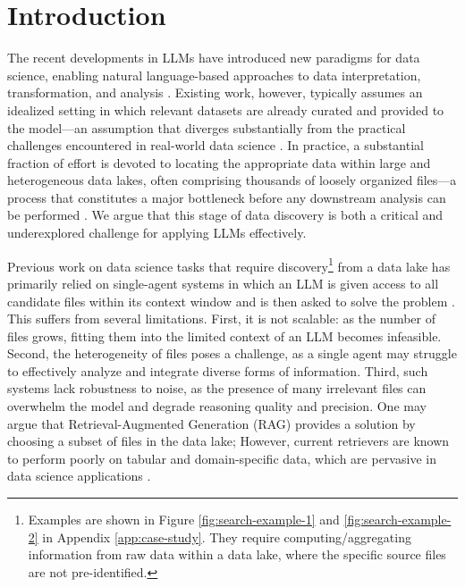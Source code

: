 
\section{Introduction}

\label{sec:introduction}


The recent developments in LLMs have introduced new paradigms for data science, enabling natural language-based approaches to data interpretation, transformation, and analysis \citep{jing2025dsbench, huang-etal-2024-da, hong-etal-2025-data, wang2025largelanguagemodelbaseddata}. Existing work, however, typically assumes an idealized setting in which relevant datasets are already curated and provided to the model---an assumption that diverges substantially from the practical challenges encountered in real-world data science \citep{lai2025kramabenchbenchmarkaisystems}. In practice, a substantial fraction of effort is devoted to locating the appropriate data within large and heterogeneous data lakes, often comprising thousands of loosely organized files---a process that constitutes a major bottleneck before any downstream analysis can be performed \citep{XU202132}. We argue that this stage of data discovery is both a critical and underexplored challenge for applying LLMs effectively. 

Previous work on data science tasks that require discovery\footnote{Examples are shown in Figure \ref{fig:search-example-1} and \ref{fig:search-example-2} in Appendix \ref{app:case-study}. They require computing/aggregating information from raw data within a data lake, where the specific source files are not pre-identified.} from a data lake has primarily relied on single-agent systems in which an LLM is given access to all candidate files within its context window and is then asked to solve the problem \citep{lai2025kramabenchbenchmarkaisystems}. This suffers from several limitations. First, it is not scalable: as the number of files grows, fitting them into the limited context of an LLM becomes infeasible. Second, the heterogeneity of files poses a challenge, as a single agent may struggle to effectively analyze and integrate diverse forms of information. Third, such systems lack robustness to noise, as the presence of many irrelevant files can overwhelm the model and degrade reasoning quality and precision. One may argue that Retrieval-Augmented Generation (RAG) \citep{10.5555/3495724.3496517, 10.1145/3626772.3657957} provides a solution by choosing a subset of files in the data lake; However, current retrievers are known to perform poorly on tabular and domain-specific data, which are pervasive in data science applications \citep{yu2025tableragretrievalaugmentedgeneration, ji2025targetbenchmarkingtableretrieval, huang-etal-2022-mixed, gu2025radarbenchmarkinglanguagemodels}.


